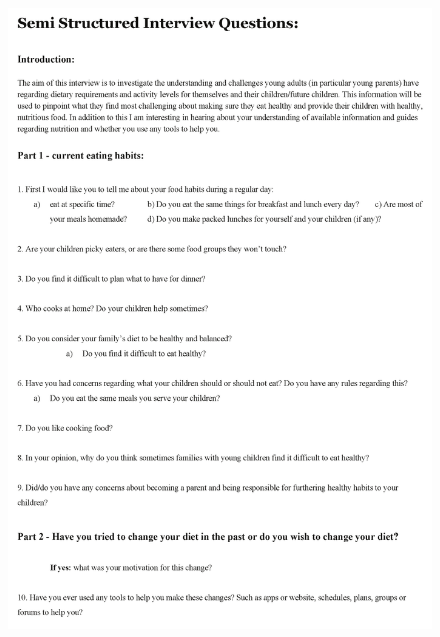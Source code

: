     \begin{figure}
        \centering
        \includegraphics[scale=0.8]{figures/intervguide2.pdf}
    \end{figure}
